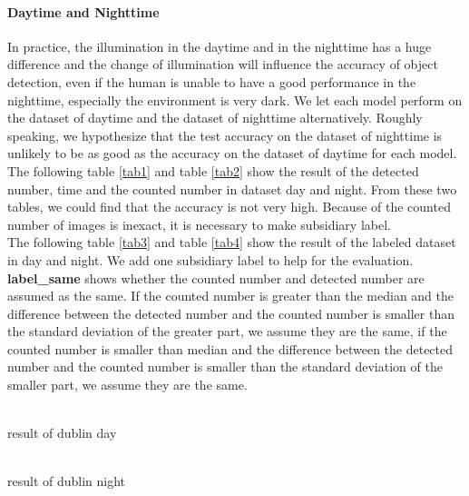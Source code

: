 \documentclass[runningheads]{llncs}
\begin{document}
\paragraph{\textbf{Daytime and Nighttime}} In practice, the illumination in the daytime and in the nighttime has a huge difference and the change of illumination will influence the accuracy of object detection, even if the human is unable to have a good performance in the nighttime, especially the environment is very dark. We let each model perform on the dataset of daytime and the dataset of nighttime alternatively.  Roughly speaking, we hypothesize that the test accuracy on the dataset of nighttime is unlikely to be as good as the accuracy on the dataset of daytime for each model.\\



The following table \ref{tab1} and table \ref{tab2} show the result of the detected number, time and the counted number in dataset day and night. From these two tables, we could find that the accuracy is not very high. Because of the counted number of images is inexact, it is necessary to make subsidiary label.\\

The following table \ref{tab3} and table \ref{tab4} show the result of the labeled dataset in day and night. We add one subsidiary label to help for the evaluation. \textbf{label\_same} shows whether the counted number and detected number are assumed as the same. If the counted number is greater than the median and the difference between the detected number and the counted number is smaller than the standard deviation of the greater part, we assume they are the same, if the counted number is smaller than median and the difference between the detected number and the counted number is smaller than the standard deviation of the smaller part, we assume they are the same.  


\begin{table}[H]
	\\
	\caption{result of dublin day}
	\label{tab1}
\end{table}
\begin{table}[H]
	\\
	\caption{result of dublin night}
	\label{tab2}
\end{table}
\end{document}
